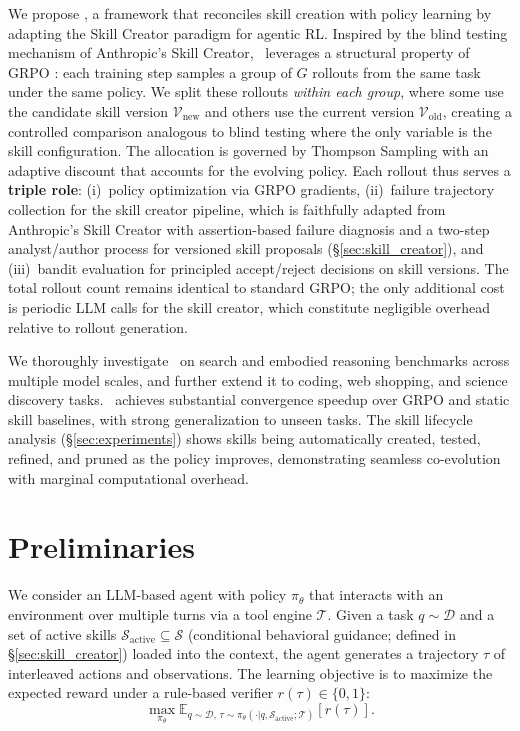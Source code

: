 \documentclass{article}
\theoremstyle{plain}
\theoremstyle{definition}
\theoremstyle{remark}
\begin{document}
We propose \ours, a framework that reconciles skill creation with policy learning by adapting the Skill Creator paradigm for agentic RL. Inspired by the blind testing mechanism of Anthropic's Skill Creator, \ours~leverages a structural property of GRPO \citep{shao2024deepseekmath}: each training step samples a group of $G$ rollouts from the same task under the same policy. We split these rollouts \textit{within each group}, where some use the candidate skill version $\mathcal{V}_{\text{new}}$ and others use the current version $\mathcal{V}_{\text{old}}$, creating a controlled comparison analogous to blind testing where the only variable is the skill configuration. The allocation is governed by Thompson Sampling \citep{thompson1933likelihood, russo2018tutorial} with an adaptive discount that accounts for the evolving policy. Each rollout thus serves a \textbf{triple role}: (i)~policy optimization via GRPO gradients, (ii)~failure trajectory collection for the skill creator pipeline, which is faithfully adapted from Anthropic's Skill Creator with assertion-based failure diagnosis and a two-step analyst/author process for versioned skill proposals (\S\ref{sec:skill_creator}), and (iii)~bandit evaluation for principled accept/reject decisions on skill versions. The total rollout count remains identical to standard GRPO; the only additional cost is periodic LLM calls for the skill creator, which constitute negligible overhead relative to rollout generation.

We thoroughly investigate \ours~on search and embodied reasoning benchmarks across multiple model scales, and further extend it to coding, web shopping, and science discovery tasks. \ours~achieves substantial convergence speedup over GRPO and static skill baselines, with strong generalization to unseen tasks. The skill lifecycle analysis (\S\ref{sec:experiments}) shows skills being automatically created, tested, refined, and pruned as the policy improves, demonstrating seamless co-evolution with marginal computational overhead.


\section{Preliminaries}

We consider an LLM-based agent with policy $\pi_\theta$ that interacts with an environment over multiple turns via a tool engine $\mathcal{T}$. Given a task $q \sim \mathcal{D}$ and a set of active skills $\mathcal{S}_{\text{active}} \subseteq \mathcal{S}$ (conditional behavioral guidance; defined in \S\ref{sec:skill_creator}) loaded into the context, the agent generates a trajectory $\tau$ of interleaved actions and observations. The learning objective is to maximize the expected reward under a rule-based verifier $r(\tau) \in \{0, 1\}$:
\begin{equation}
    \max_{\pi_\theta} \mathbb{E}_{q \sim \mathcal{D},\, \tau \sim \pi_\theta(\cdot|q, \mathcal{S}_{\text{active}};\mathcal{T})} \left[ r(\tau)
    \right].
    \label{eq:rl_objective}
\end{equation}
\end{document}
